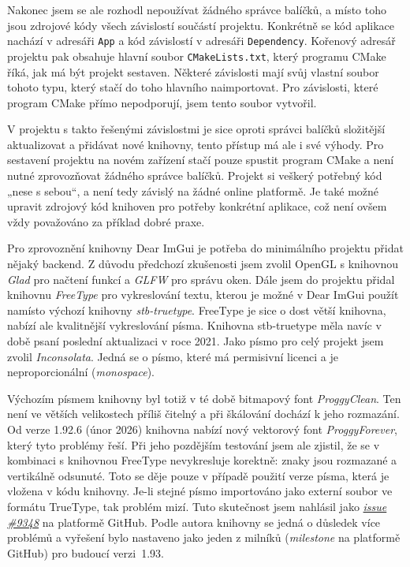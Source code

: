 \documentclass[FM,DP]{tulthesis}
\begin{document}
	Nakonec jsem se ale rozhodl nepoužívat žádného správce balíčků, a místo toho jsou zdrojové kódy všech závislostí součástí projektu. Konkrétně se kód aplikace nachází v adresáři \texttt{App} a kód závislostí v adresáři \texttt{Dependency}. Kořenový adresář projektu pak obsahuje hlavní soubor \texttt{CMakeLists.txt}, který programu CMake říká, jak má být projekt sestaven. Některé závislosti mají svůj vlastní soubor tohoto typu, který stačí do toho hlavního naimportovat. Pro závislosti, které program CMake přímo nepodporují, jsem tento soubor vytvořil.
	
	V projektu s takto řešenými závislostmi je sice oproti správci balíčků složitější aktualizovat a přidávat nové knihovny, tento přístup má ale i své výhody. Pro sestavení projektu na novém zařízení stačí pouze spustit program CMake a není nutné zprovozňovat žádného správce balíčků. Projekt si veškerý potřebný kód „nese s sebou“, a není tedy závislý na žádné online platformě. Je také možné upravit zdrojový kód knihoven pro potřeby konkrétní aplikace, což není ovšem vždy považováno za příklad dobré praxe.
	
	Pro zprovoznění knihovny Dear ImGui je potřeba do minimálního projektu přidat nějaký backend. Z důvodu předchozí zkušenosti jsem zvolil OpenGL s knihovnou \textit{Glad} pro načtení funkcí a \textit{GLFW} pro správu oken. Dále jsem do projektu přidal knihovnu \textit{FreeType} pro vykreslování textu, kterou je možné v Dear ImGui použít namísto výchozí knihovny \textit{stb-truetype}. FreeType je sice o dost větší knihovna, nabízí ale kvalitnější vykreslování písma. Knihovna stb-truetype měla navíc v době psaní poslední aktualizaci v roce 2021. Jako písmo pro celý projekt jsem zvolil \textit{\mbox{Inconsolata}}. Jedná se o písmo, které má permisivní licenci a je neproporcionální (\textit{monospace}). %

	Výchozím písmem knihovny byl totiž v té době bitmapový font \textit{ProggyClean}. Ten není ve větších velikostech příliš čitelný a při škálování dochází k jeho rozmazání. Od verze 1.92.6 (únor 2026) knihovna nabízí nový vektorový font \textit{ProggyForever}, který tyto problémy řeší. Při jeho pozdějším testování jsem ale zjistil, že se v kombinaci s knihovnou FreeType nevykresluje korektně: znaky jsou rozmazané a vertikálně odsunuté. Toto se děje pouze v případě použití verze písma, která je vložena v kódu knihovny. Je-li stejné písmo importováno jako externí soubor ve formátu \mbox{TrueType}, tak problém mizí. Tuto skutečnost jsem nahlásil jako \href{https://github.com/ocornut/imgui/issues/9348}{\textit{issue \#9348}} na platformě GitHub. Podle autora knihovny se jedná o důsledek více problémů a vyřešení bylo nastaveno jako jeden z milníků (\textit{milestone} na platformě GitHub) pro budoucí verzi~1.93.
\end{document}
